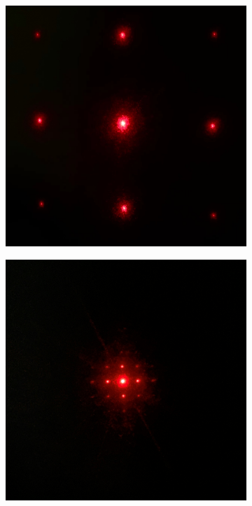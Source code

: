 \documentclass[a4paper]{article}
\begin{document}
\begin{figure}[H]
    \centering
    \begin{subfigure}[t]{0.35\textwidth}
        \centering
        \includegraphics[width=\textwidth]{phone-img/6.jpg}
        \caption{}
        \label{fig8-1}
    \end{subfigure}
    \begin{subfigure}[t]{0.35\textwidth}
        \centering
        \includegraphics[width=\textwidth]{phone-img/5.jpg}

\end{subfigure}
\end{figure}
\end{document}
